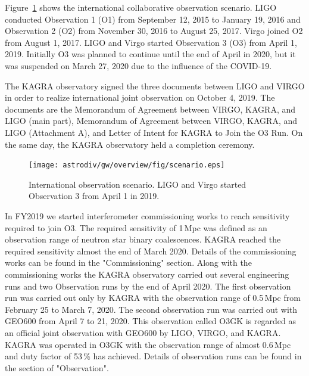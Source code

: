 Figure~\ref{fig:scenario} shows the international collaborative observation scenario\cite{scenario_paper}. LIGO conducted Observation 1 (O1) from September 12, 2015 to January 19, 2016 and Observation 2 (O2) from November 30, 2016 to August 25, 2017. Virgo joined O2 from August 1, 2017. LIGO and Virgo started Observation 3 (O3) from April 1, 2019. Initially O3 was planned to continue until the end of April in 2020, but it was suspended on March 27, 2020 due to the influence of the COVID-19\cite{o3_suspend}. 

The KAGRA observatory signed the three documents between LIGO and VIRGO in order to realize international joint observation on October 4, 2019. The documents are the Memorandum of Agreement between VIRGO, KAGRA, and LIGO (main part)\cite{moa}, Memorandum of Agreement between VIRGO, KAGRA, and LIGO (Attachment A)\cite{moa_at}, and Letter of Intent for KAGRA to Join the O3 Run\cite{loi_o3}. On the same day, the KAGRA observatory held a completion ceremony.



\begin{figure}
\begin{center}
\texttt{[image: astrodiv/gw/overview/fig/scenario.eps]}
\caption{International observation scenario\cite{scenario_paper}. LIGO and Virgo  started Observation 3 from April 1 in 2019. }
\label{fig:scenario}
\end{center}
\end{figure}


In FY2019 we started interferometer commissioning works to reach sensitivity required to join O3. The required sensitivity of 1\,Mpc was defined as an observation range of neutron star binary coalescences\cite{loi_o3}. KAGRA reached the required sensitivity almost the end of March 2020. Details of the commissioning works can be found in the "Commissioning" section. Along with the commissioning works the KAGRA observatory carried out several engineering runs and two Observation runs by the end of April 2020. The first observation run was carried out only by KAGRA with the observation range of 0.5\,Mpc from February 25 to March 7, 2020. The second observation run was carried out with GEO600 from April 7 to 21, 2020. This observation called O3GK is regarded as an official joint observation with GEO600 by LIGO, VIRGO, and KAGRA. KAGRA was operated in O3GK with the observation range of almost 0.6\,Mpc and duty factor of 53\,\% has achieved. Details of observation runs can be found in the section of "Observation".



